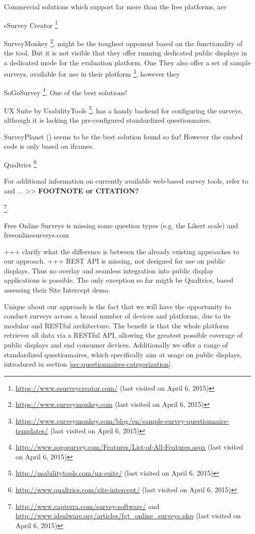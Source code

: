 	Commercial solutions which support far more than the free platforms, are 
	
		eSurvey Creator \footnote{\url{https://www.esurveycreator.com/} (last visited on April 6, 2015)}

		SurveyMonkey \footnote{\url{https://www.surveymonkey.com} (last visited on April 6, 2015)}, might be the toughest opponent based on the functionality of the tool. But it is not visible that they offer running dedicated public displays in a dedicated mode for the evaluation platform. One
		They also offer a set of sample surveys, available for use in their platform \footnote{\url{https://www.surveymonkey.com/blog/en/sample-survey-questionnaire-templates/} (last visited on April 6, 2015)}, however they 

		SoGoSurvey \footnote{\url{http://www.sogosurvey.com/Features/List-of-All-Features.aspx} (last visited on April 6, 2015)}. One of the best solutions!

		UX Suite by UsabilityTools \footnote{\url{http://usabilitytools.com/ux-suite/} (last visited on April 6, 2015)}, has a handy backend for configuring the surveys, although it is lacking the pre-configured standardized questionnaires. 

		SurveyPlanet () seems to be the best solution found so far! However the embed code is only based on iframes.

		Qualtrics \footnote{\url{http://www.qualtrics.com/site-intercept/} (last visited on April 6, 2015)}

		For additional information on currently available web-based survey tools, refer to \cite{Capterra2015SurveyTools} and ... >> \textbf{FOOTNOTE or CITATION?}

		\footnote{\url{http://www.capterra.com/survey-software/} and \url{http://www.idealware.org/articles/fgt_online_surveys.php} (last visited on April 6, 2015)}.

		Free Online Surveys is missing some question types (e.g. the Likert scale) and freeonlinesurveys.com


	+++ clarify what the difference is between the already existing approaches to our approach.
	+++ REST API is missing, not designed for use on public displays. Thus no overlay and seamless integration into public display applications is possible. The only exception so far migth be Qualtrics, based assessing their Site Intercept demo.




	Unique about our approach is the fact that we will have the opportunity to conduct surveys across a broad number of devices and platforms, due to its modular and RESTful architecture. The benefit is that the whole platform retrieves all data via a RESTful API, allowing the greatest possible coverage of public displays and end consumer devices. Additionally we offer a range of standardized questionnaires, which specifically aim at usage on public displays, introduced in section \ref{sec:questionnaires-categorization}.





